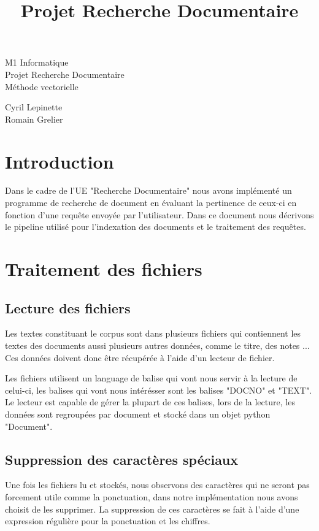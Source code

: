 \documentclass[11pt]{article}
\begin{document}
\title{Projet Recherche Documentaire}



\begin{center}


\Huge M1 Informatique \\
\vspace{3cm}
Projet Recherche Documentaire\\

Méthode vectorielle \LARGE
\end{center}






\vspace{15cm}
Cyril Lepinette \\
Romain Grelier

\pagebreak

\section{Introduction}
Dans le cadre de l'UE "Recherche Documentaire" nous avons implémenté un programme de recherche de document en évaluant la pertinence de ceux-ci en fonction d'une requête envoyée par l'utilisateur.
Dans ce document nous décrivons le pipeline utilisé pour l'indexation des documents et le traitement des requêtes.

\section{Traitement des fichiers}

\subsection{Lecture des fichiers}
Les textes constituant le corpus sont dans plusieurs fichiers qui contiennent les textes des documents aussi plusieurs autres données, comme le titre, des notes ...
Ces données doivent donc être récupérée à l'aide d'un lecteur de fichier.

Les fichiers utilisent un language de balise qui vont nous servir à la lecture de celui-ci, les balises qui vont nous intérésser sont les balises "DOCNO" et "TEXT".
Le lecteur est capable de gérer la plupart de ces balises, lors de la lecture, les données sont regroupées par document et stocké dans un objet python "Document".

\subsection{Suppression des caractères spéciaux}
Une fois les fichiers lu et stockés, nous observons des caractères qui ne seront pas forcement utile comme la ponctuation, dans notre implémentation nous avons choisit de les supprimer.
La suppression de ces caractères se fait à l'aide d'une expression régulière pour la ponctuation et les chiffres.
\end{document}

